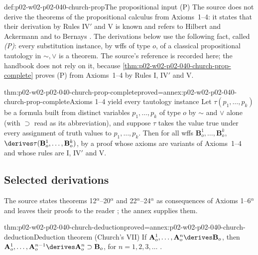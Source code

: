 \begin{hbconvention}{def:p02-w02-p02-040-church-prop}{The propositional input (P)}
The source does not derive the theorems of the propositional calculus from
Axioms~1--4: it states that their derivation by Rules IV\('\) and V is
known and refers to Hilbert and Ackermann and to Bernays
\cite[\S5, p.~62 and n.~9]{Church1940}.  The derivations below use the
following fact, called \emph{(P)}: every substitution instance, by
wffs of type \(o\), of a classical propositional tautology in
\(\sim,\vee\) is a theorem.  The source's reference is recorded here; the
handbook does not rely on it, because
\cref{thm:p02-w02-p02-040-church-prop-complete} proves (P) from Axioms~1--4
by Rules I, IV\('\) and V.
\end{hbconvention}

\begin{hbtheorem}{thm:p02-w02-p02-040-church-prop-complete}{proved=annex:p02-w02-p02-040-church-prop-complete}{Axioms 1--4 yield every tautology instance}
Let \(\tau(p_1,\ldots,p_k)\) be a formula built from distinct variables
\(p_1,\ldots,p_k\) of type \(o\) by \(\sim\) and \(\vee\) alone (with
\(\supset\) read as its abbreviation), and suppose \(\tau\) takes the value
true under every assignment of truth values to \(p_1,\ldots,p_k\).  Then for
all wffs \(\mathbf B^1_o,\ldots,\mathbf B^k_o\),
\(\derives\tau(\mathbf B^1_o,\ldots,\mathbf B^k_o)\), by a proof whose axioms
are variants of Axioms~1--4 and whose rules are I, IV\('\) and V.
\end{hbtheorem}

\subsection{Selected derivations}

The source states theorems 12\(^\alpha\)--20\(^\alpha\) and
22\(^\alpha\)--24\(^\alpha\) as consequences of Axioms 1--6\(^\alpha\) and
leaves their proofs to the reader \cite[\S5, p.~63; \S6, p.~64]{Church1940};
the annex supplies them.

\begin{hbtheorem}{thm:p02-w02-p02-040-church-deduction}{proved=annex:p02-w02-p02-040-church-deduction}{Deduction theorem (Church's VII)}
If \(\mathbf A^1_o,\ldots,\mathbf A^n_o\derives\mathbf B_o\), then
\(\mathbf A^1_o,\ldots,\mathbf A^{n-1}_o\derives\mathbf A^n_o\supset\mathbf B_o\),
for \(n=1,2,3,\ldots\) \cite[\S5, pp.~62--63]{Church1940}.
\end{hbtheorem}

